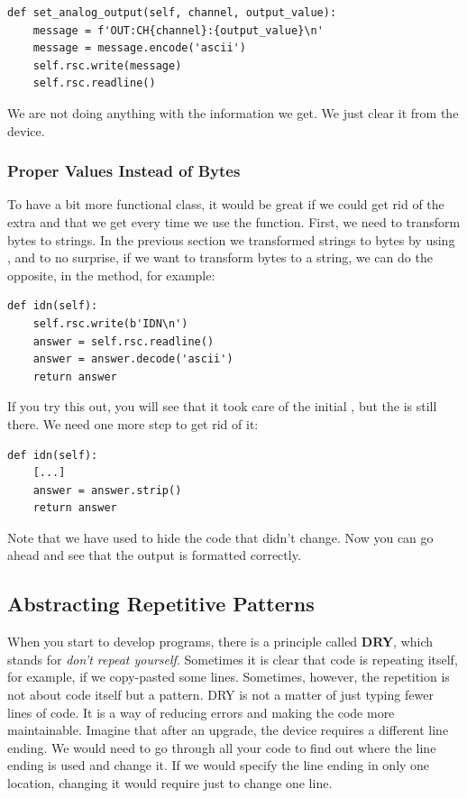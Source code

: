\begin{verbatim}
def set_analog_output(self, channel, output_value):
    message = f'OUT:CH{channel}:{output_value}\n'
    message = message.encode('ascii')
    self.rsc.write(message)
    self.rsc.readline()
\end{verbatim}

We are not doing anything with the information we get. We just clear it from the device.

\subsubsection{Proper Values Instead of Bytes}
To have a bit more functional class, it would be great if we could get rid of the extra  and \py{\n} that we get every time we use the  function. First, we need to transform bytes to strings. In the previous section we transformed strings to bytes by using , and to no surprise, if we want to transform bytes to a string, we can do the opposite, in the  method, for example:

\begin{verbatim}
def idn(self):
    self.rsc.write(b'IDN\n')
    answer = self.rsc.readline()
    answer = answer.decode('ascii')
    return answer
\end{verbatim}

If you try this out, you will see that it took care of the initial , but the \py{\n} is still there. We need one more step to get rid of it:

\begin{verbatim}
def idn(self):
    [...]
    answer = answer.strip()
    return answer
\end{verbatim}

Note that we have used %
\py{[...]} to hide the code that didn't change. Now you can go ahead and see that the output is formatted correctly.


\subsection{Abstracting Repetitive Patterns}\label{subsec:abstracting-repetitive-patterns}
When you start to develop programs, there is a principle called \textbf{DRY}, which stands for \emph{don't repeat yourself}. Sometimes it is clear that code is repeating itself, for example, if we copy-pasted some lines. Sometimes, however, the repetition is not about code itself but a pattern. {DRY} is not a matter of just typing fewer lines of code. It is a way of reducing errors and making the code more maintainable. Imagine that after an upgrade, the device requires a different line ending. We would need to go through all your code to find out where the line ending is used and change it. If we would specify the line ending in only one location, changing it would require just to change one line.

